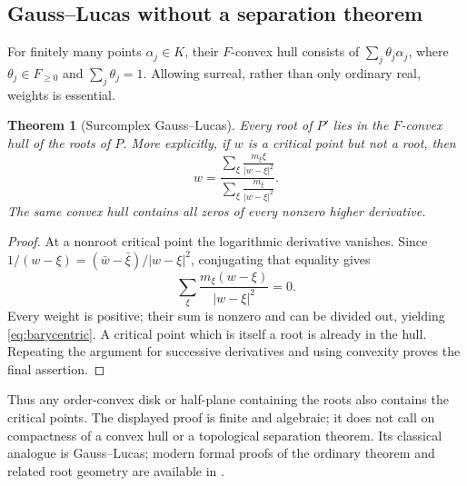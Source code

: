 \documentclass[11pt,letterpaper]{article}
\numberwithin{equation}{section}
\newtheorem{theorem}{Theorem}[section]
\theoremstyle{definition}
\theoremstyle{remark}\newtheorem{remark}[theorem]{Remark}
\begin{document}
\subsection{Gauss--Lucas without a separation theorem}
For finitely many points $\alpha_j\in K$, their $F$-convex hull consists
of $\sum_j\theta_j\alpha_j$, where $\theta_j\in F_{\ge0}$ and
$\sum_j\theta_j=1$. Allowing surreal, rather than only ordinary real,
weights is essential.

\begin{theorem}[Surcomplex Gauss--Lucas]\label{thm:gausslucas}
Every root of $P'$ lies in the $F$-convex hull of the roots of $P$.
More explicitly, if $w$ is a critical point but not a root, then
\begin{equation}\label{eq:barycentric}
 w=\frac{\displaystyle\sum_\xi
      \frac{m_\xi\xi}{|w-\xi|^2}}
        {\displaystyle\sum_\xi\frac{m_\xi}{|w-\xi|^2}}.
\end{equation}
The same convex hull contains all zeros of every nonzero higher derivative.
\end{theorem}
\begin{proof}
At a nonroot critical point the logarithmic derivative vanishes. Since
$1/(w-\xi)=(\bar w-\bar\xi)/|w-\xi|^2$, conjugating that equality gives
\[
 \sum_\xi\frac{m_\xi(w-\xi)}{|w-\xi|^2}=0.
\]
Every weight is positive; their sum is nonzero and can be divided out,
yielding \eqref{eq:barycentric}. A critical point which is itself a root
is already in the hull. Repeating the argument for successive derivatives
and using convexity proves the final assertion.
\end{proof}
Thus any order-convex disk or half-plane containing the roots also
contains the critical points. The displayed proof is finite and algebraic;
it does not call on compactness of a convex hull or a topological
separation theorem. Its classical analogue is Gauss--Lucas; modern formal
proofs of the ordinary theorem and related root geometry are available
in \cite{Eberl}.
\end{document}
